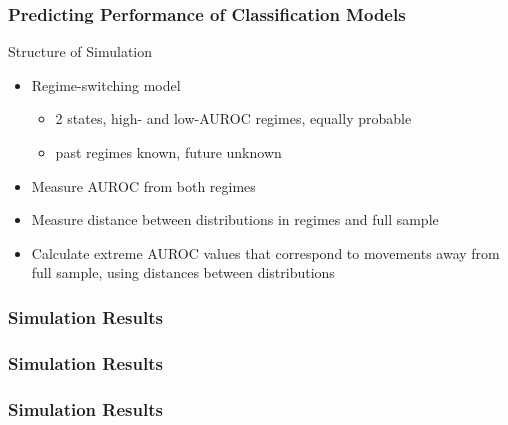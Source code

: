 \documentclass{beamer}
\begin{document}
\begin{frame}
\frametitle{Predicting Performance of Classification Models}

Structure of Simulation
\begin{itemize}
    \item Regime-switching model
    \begin{itemize}
        \item 2 states, high- and low-AUROC regimes, equally probable
        \item past regimes known, future unknown
    \end{itemize}
    \item Measure AUROC from both regimes
    \item Measure distance between distributions in regimes and full sample
    \item Calculate extreme AUROC values that correspond to movements away from full sample, using distances between distributions
\end{itemize}

\end{frame}



\begin{frame}
\frametitle{Simulation Results}




\end{frame}



\begin{frame}
\frametitle{Simulation Results}




\end{frame}



\begin{frame}
\frametitle{Simulation Results}




\end{frame}
\end{document}

